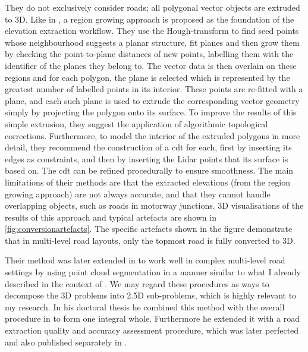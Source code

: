 They do not exclusively consider roads; all polygonal vector objects are extruded to 3D. Like in \cite{hatger_brenner_2003}, a region growing approach is proposed as the foundation of the elevation extraction workflow. They use the Hough-transform to find seed points whose neighbourhood suggests a planar structure, fit planes and then grow them by checking the point-to-plane distances of new points, labelling them with the identifier of the planes they belong to. The vector data is then overlain on these regions and for each polygon, the plane is selected which is represented by the greatest number of labelled points in its interior. These points are re-fitted with a plane, and each such plane is used to extrude the corresponding vector geometry simply by projecting the polygon onto its surface. To improve the results of this simple extrusion, they suggest the application of algorithmic topological corrections. Furthermore, to model the interior of the extruded polygons in more detail, they recommend the construction of a \ac{cdt} for each, first by inserting its edges as constraints, and then by inserting the Lidar points that its surface is based on. The \ac{cdt} can be refined procedurally to ensure smoothness. The main limitations of their methods are that the extracted elevations (from the region growing approach) are not always accurate, and that they cannot handle overlapping objects, such as roads in motorway junctions. 3D visualisations of the results of this approach and typical artefacts are shown in \ref{fig:conversionartefacts}. The specific artefacts shown in the figure demonstrate that in multi-level road layouts, only the topmost road is fully converted to 3D.

Their method was later extended in \cite{oudeElberink_vosselman_2009} to work well in complex multi-level road settings by using point cloud segmentation in a manner similar to what I already described in the context of \cite{boyko_funkhauser_2011}. We may regard these procedures as ways to decompose the 3D problems into 2.5D sub-problems, which is highly relevant to my research. In his doctoral thesis \cite{oudeElberink_2010} he combined this method with the overall procedure in \cite{oudeElberink_vosselman_2006} to form one integral whole. Furthermore he extended it with a road extraction quality and accuracy assessment procedure, which was later perfected and also published separately in \cite{oudeElberink_vosselman_2012}.

